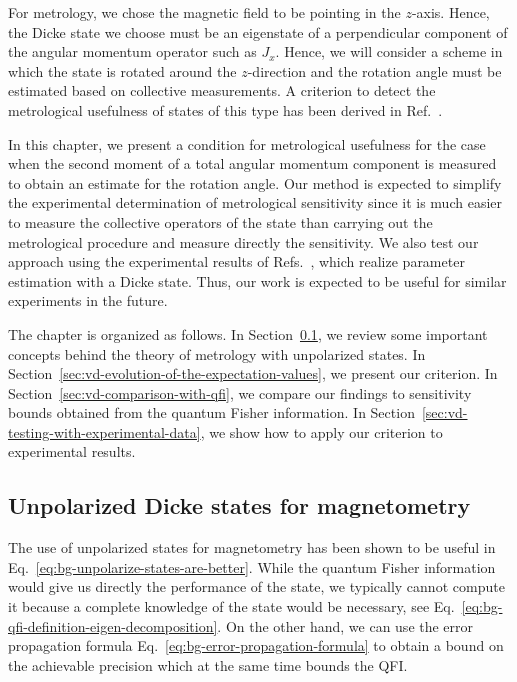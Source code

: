 For metrology, we chose the magnetic field to be pointing in the $z$-axis.
Hence, the Dicke state we choose must be an eigenstate of a perpendicular component of the angular momentum operator such as $J_x$.
Hence, we will consider a scheme in which the state is rotated around the $z$-direction and the rotation angle must be estimated based on collective measurements.
A criterion to detect the metrological usefulness of states of this type has been derived in Ref.~\cite{Zhang2014}.

In this chapter, we present a condition for metrological usefulness for the case when the second moment of a total angular momentum component is measured to obtain an estimate for the rotation angle.
Our method is expected to simplify the experimental determination of metrological sensitivity since it is much easier to measure the collective operators of the state than carrying out the metrological procedure and measure directly the sensitivity.
We also test our approach using the experimental results of Refs.~\cite{Luecke2011, Krischek2011}, which realize parameter estimation with a Dicke state.
Thus, our work is expected to be useful for similar experiments in the future.

The chapter is organized as follows.
In Section~\ref{sec:vd-unpolarized-states-magnetometry}, we review some important concepts behind the theory of metrology with unpolarized states.
In Section~\ref{sec:vd-evolution-of-the-expectation-values}, we present our criterion.
In Section~\ref{sec:vd-comparison-with-qfi}, we compare our findings to sensitivity bounds obtained from the quantum Fisher information.
In Section~\ref{sec:vd-testing-with-experimental-data}, we show how to apply our criterion to experimental results.

\subsection{Unpolarized Dicke states for magnetometry}
\label{sec:vd-unpolarized-states-magnetometry}

The use of unpolarized states for magnetometry has been shown to be useful in Eq.~\eqref{eq:bg-unpolarize-states-are-better}.
While the quantum Fisher information would give us directly the performance of the state, we typically cannot compute it because a complete knowledge of the state would be necessary, see Eq.~\eqref{eq:bg-qfi-definition-eigen-decomposition}.
On the other hand, we can use the error propagation formula Eq.~\eqref{eq:bg-error-propagation-formula} to obtain a bound on the achievable precision which at the same time bounds the QFI.

